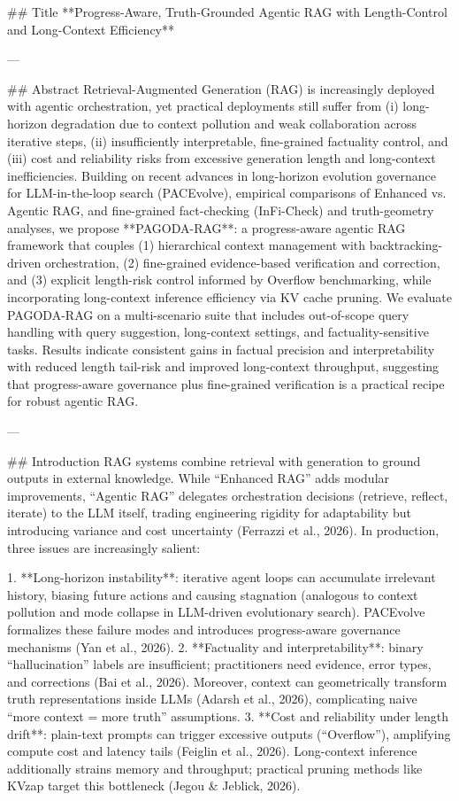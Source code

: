 ## Title  
**Progress-Aware, Truth-Grounded Agentic RAG with Length-Control and Long-Context Efficiency**

---

## Abstract  
Retrieval-Augmented Generation (RAG) is increasingly deployed with agentic orchestration, yet practical deployments still suffer from (i) long-horizon degradation due to context pollution and weak collaboration across iterative steps, (ii) insufficiently interpretable, fine-grained factuality control, and (iii) cost and reliability risks from excessive generation length and long-context inefficiencies. Building on recent advances in long-horizon evolution governance for LLM-in-the-loop search (PACEvolve), empirical comparisons of Enhanced vs. Agentic RAG, and fine-grained fact-checking (InFi-Check) and truth-geometry analyses, we propose **PAGODA-RAG**: a progress-aware agentic RAG framework that couples (1) hierarchical context management with backtracking-driven orchestration, (2) fine-grained evidence-based verification and correction, and (3) explicit length-risk control informed by Overflow benchmarking, while incorporating long-context inference efficiency via KV cache pruning. We evaluate PAGODA-RAG on a multi-scenario suite that includes out-of-scope query handling with query suggestion, long-context settings, and factuality-sensitive tasks. Results indicate consistent gains in factual precision and interpretability with reduced length tail-risk and improved long-context throughput, suggesting that progress-aware governance plus fine-grained verification is a practical recipe for robust agentic RAG.

---

## Introduction  
RAG systems combine retrieval with generation to ground outputs in external knowledge. While “Enhanced RAG” adds modular improvements, “Agentic RAG” delegates orchestration decisions (retrieve, reflect, iterate) to the LLM itself, trading engineering rigidity for adaptability but introducing variance and cost uncertainty (Ferrazzi et al., 2026). In production, three issues are increasingly salient:

1. **Long-horizon instability**: iterative agent loops can accumulate irrelevant history, biasing future actions and causing stagnation (analogous to context pollution and mode collapse in LLM-driven evolutionary search). PACEvolve formalizes these failure modes and introduces progress-aware governance mechanisms (Yan et al., 2026).  
2. **Factuality and interpretability**: binary “hallucination” labels are insufficient; practitioners need evidence, error types, and corrections (Bai et al., 2026). Moreover, context can geometrically transform truth representations inside LLMs (Adarsh et al., 2026), complicating naive “more context = more truth” assumptions.  
3. **Cost and reliability under length drift**: plain-text prompts can trigger excessive outputs (“Overflow”), amplifying compute cost and latency tails (Feiglin et al., 2026). Long-context inference additionally strains memory and throughput; practical pruning methods like KVzap target this bottleneck (Jegou & Jeblick, 2026).

